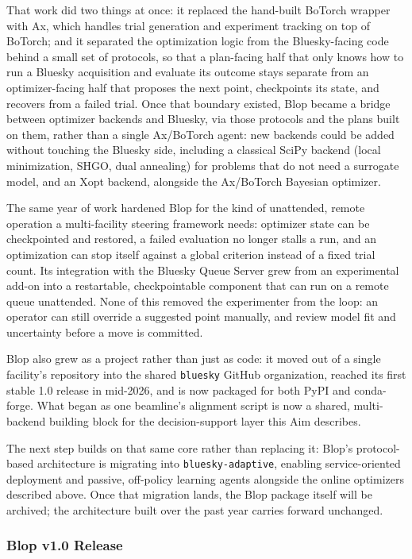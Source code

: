 That work did two things at once: it replaced the hand-built BoTorch wrapper with
Ax, which handles trial generation and experiment tracking on top of BoTorch; and
it separated the optimization logic from the Bluesky-facing code behind a small
set of protocols, so that a plan-facing half that only knows how to run a Bluesky
acquisition and evaluate its outcome stays separate from an optimizer-facing half
that proposes the next point, checkpoints its state, and recovers from a failed
trial. Once that boundary existed, Blop became a bridge between optimizer backends
and Bluesky, via those protocols and the plans built on them, rather than a single
Ax/BoTorch agent: new backends could be added without touching the Bluesky side,
including a classical SciPy backend (local minimization, SHGO, dual annealing) for
problems that do not need a surrogate model, and an Xopt backend, alongside the
Ax/BoTorch Bayesian optimizer.

The same year of work hardened Blop for the kind of unattended, remote operation a
multi-facility steering framework needs: optimizer state can be checkpointed and
restored, a failed evaluation no longer stalls a run, and an optimization can stop
itself against a global criterion instead of a fixed trial count. Its integration
with the Bluesky Queue Server grew from an experimental add-on into a restartable,
checkpointable component that can run on a remote queue unattended. None of this
removed the experimenter from the loop: an operator can still override a suggested
point manually, and review model fit and uncertainty before a move is committed.

Blop also grew as a project rather than just as code: it moved out of a single
facility's repository into the shared \texttt{bluesky} GitHub organization,
reached its first stable 1.0 release in mid-2026, and is now packaged for both PyPI
and conda-forge. What began as one beamline's alignment script is now a shared,
multi-backend building block for the decision-support layer this Aim describes.

The next step builds on that same core rather than replacing it: Blop's
protocol-based architecture is migrating into \texttt{bluesky-adaptive}, enabling
service-oriented deployment and passive, off-policy learning agents alongside the
online optimizers described above. Once that migration lands, the Blop package
itself will be archived; the architecture built over the past year carries forward
unchanged.

\subsubsection{Blop v1.0 Release}

